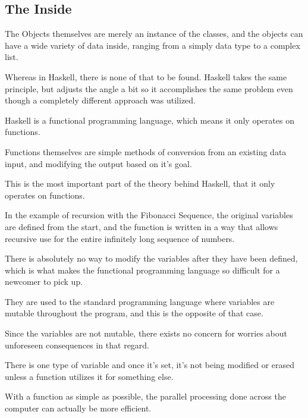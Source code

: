 \documentclass{article}
\begin{document}
\medskip\medskip
\begin{lstlisting}
\end{lstlisting}

\medskip

\subsection{The Inside}
\medskip\medskip
\hspace{\parindent} 

The Objects themselves are merely an instance of the classes, and the objects can have a wide variety of data inside, ranging from a simply data type to a complex list.

\medskip\noindent
Whereas in Haskell, there is none of that to be found. Haskell takes the same principle, but adjusts the angle a bit so it accomplishes the same problem even though a completely different approach was utilized. 

\medskip\noindent
Haskell is a functional programming language, which means it only operates on functions.

\medskip\noindent
Functions themselves are simple methods of conversion from an existing data input, and modifying the output based on it's goal.

\medskip\noindent
This is the most important part of the theory behind Haskell, that it only operates on functions. 

\medskip\noindent
In the example of recursion with the Fibonacci Sequence, the original variables are defined from the start, and the function is written in a way that allows recursive use for the entire infinitely long sequence of numbers. 

\medskip\noindent
There is absolutely no way to modify the variables after they have been defined, which is what makes the functional programming language so difficult for a newcomer to pick up. 

\medskip\noindent
They are used to the standard programming language where variables are mutable throughout the program, and this is the opposite of that case.

\medskip\noindent
Since the variables are not mutable, there exists no concern for worries about unforeseen consequences in that regard. 

\medskip\noindent
There is one type of variable and once it's set, it's not being modified or erased unless a function utilizes it for something else.

\medskip\noindent
With a function as simple as possible, the parallel processing done across the computer can actually be more efficient. 
\end{document}
